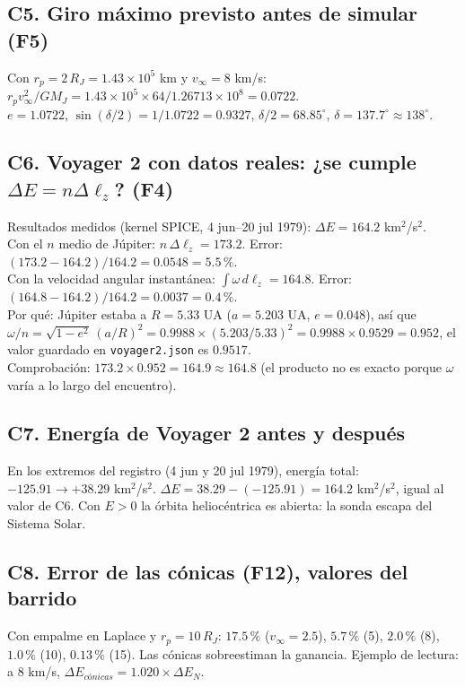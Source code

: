 \documentclass[11pt,letterpaper]{article}
\newcommand{\vinf}{v_\infty}\newcommand{\RJ}{R_J}
\begin{document}
\subsection*{C5. Giro máximo previsto antes de simular (F5)}
Con $r_p=2\,R_J=1.43\times10^5$ km y $\vinf=8$ km/s: $r_p\vinf^2/GM_J=1.43\times10^5\times64/1.26713\times10^8=0.0722$.\\
$e=1.0722$, $\sin(\delta/2)=1/1.0722=0.9327$, $\delta/2=68.85^\circ$, $\delta=\mathbf{137.7^\circ}\approx138^\circ$.

\subsection*{C6. Voyager 2 con datos reales: ¿se cumple $\Delta E=n\Delta\ell_z$? (F4)}
Resultados medidos (kernel SPICE, 4 jun–20 jul 1979): $\Delta E=164.2$ km$^2$/s$^2$.\\
Con el $n$ medio de Júpiter: $n\,\Delta\ell_z=173.2$. Error: $(173.2-164.2)/164.2=0.0548=\mathbf{5.5\,\%}$.\\
Con la velocidad angular instantánea: $\int\omega\,d\ell_z=164.8$. Error: $(164.8-164.2)/164.2=0.0037=\mathbf{0.4\,\%}$.\\
Por qué: Júpiter estaba a $R=5.33$ UA ($a=5.203$ UA, $e=0.048$), así que $\omega/n=\sqrt{1-e^2}\,(a/R)^2=0.9988\times(5.203/5.33)^2=0.9988\times0.9529=0.952$, el valor guardado en \texttt{voyager2.json} es $0.9517$.\\
Comprobación: $173.2\times0.952=164.9\approx164.8$ (el producto no es exacto porque $\omega$ varía a lo largo del encuentro).

\subsection*{C7. Energía de Voyager 2 antes y después}
En los extremos del registro (4 jun y 20 jul 1979), energía total: $-125.91\to+38.29$ km$^2$/s$^2$. $\Delta E=38.29-(-125.91)=164.2$ km$^2$/s$^2$, igual al valor de C6. Con $E>0$ la órbita heliocéntrica es abierta: la sonda escapa del Sistema Solar.

\subsection*{C8. Error de las cónicas (F12), valores del barrido}
Con empalme en Laplace y $r_p=10\,R_J$: $17.5\,\%$ ($\vinf=2.5$), $5.7\,\%$ (5), $2.0\,\%$ (8), $1.0\,\%$ (10), $0.13\,\%$ (15). Las cónicas sobreestiman la ganancia. Ejemplo de lectura: a 8 km/s, $\Delta E_{cónicas}=1.020\times\Delta E_{N}$.
\end{document}
